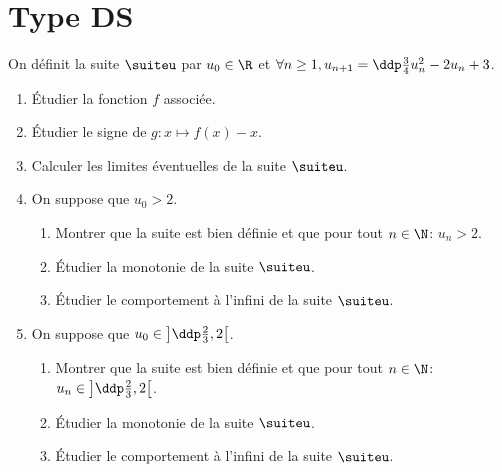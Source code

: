 \documentclass[a4paper, 11pt]{article}
\begin{document}
\section*{Type DS}


\begin{exercice} \;
On d\'efinit la suite $\suiteu$ par $u_0\in\R$ et $\forall n \geq 1, u_{n+1}=\ddp\frac{3}{4}u_n^2-2u_n+3$.
\begin{enumerate}
\item \'Etudier la fonction $f$ associ\'ee.
\item \'Etudier le signe de $g: x\mapsto f(x)-x$.
\item Calculer les limites \'eventuelles de la suite $\suiteu$.
\item On suppose que $u_0>2$.
\begin{enumerate}
\item Montrer que la suite est bien d\'efinie et que pour tout $n\in\N$: $u_n>2$.
\item \'Etudier la monotonie de la suite $\suiteu$.
\item \'Etudier le comportement \`{a} l'infini de la suite $\suiteu$.
\end{enumerate}
\item On suppose que $u_0\in\left\rbrack \ddp\frac{2}{3},2\right\lbrack $.
\begin{enumerate}
\item Montrer que la suite est bien d\'efinie et que pour tout $n\in\N$: $u_n\in\left\rbrack \ddp\frac{2}{3},2\right\lbrack$.
\item \'Etudier la monotonie de la suite $\suiteu$.
\item \'Etudier le comportement \`{a} l'infini de la suite $\suiteu$.
\end{enumerate} 
\end{enumerate}
\end{exercice}
\end{document}
